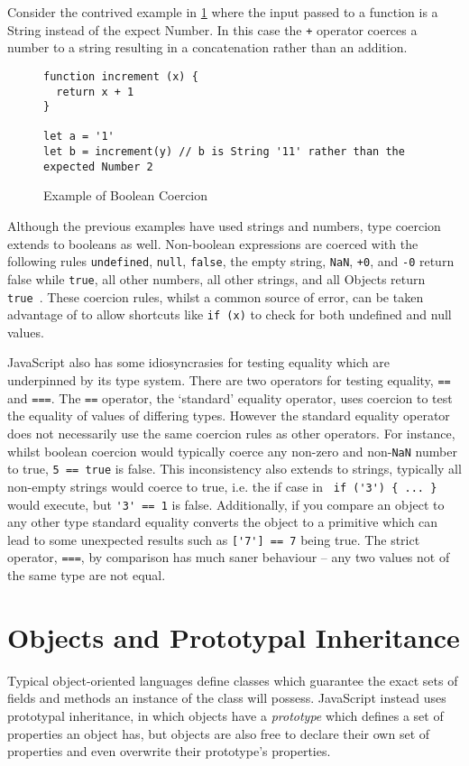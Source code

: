 \documentclass[]{final_report}
\begin{document}
Consider the contrived example in \ref{fig:js-increment-concat} where the input passed to a function is a String instead of the expect Number. In this case the \lstinline{+} operator coerces a number to a string resulting in a concatenation rather than an addition.

\begin{figure}[h]
\begin{verbatim}
function increment (x) {
  return x + 1
}

let a = '1'
let b = increment(y) // b is String '11' rather than the expected Number 2
\end{verbatim}
\caption{\label{fig:js-increment-concat} Example of Boolean Coercion}
\end{figure} 

Although the previous examples have used strings and numbers, type coercion extends to booleans as well. Non-boolean expressions are coerced with the following rules \lstinline{undefined}, \lstinline{null}, \lstinline{false}, the empty string, \lstinline{NaN}, \lstinline{+0}, and \lstinline{-0} return false while \lstinline{true}, all other numbers, all other strings, and all Objects return \lstinline{true}~\cite{EcmaScript}. These coercion rules, whilst a common source of error, can be taken advantage of to allow shortcuts like \lstinline{if (x)} to check for both undefined and null values.

JavaScript also has some idiosyncrasies for testing equality which are underpinned by its type system. There are two operators for testing equality, \lstinline{==} and \lstinline{===}. The \lstinline{==} operator, the `standard' equality operator, uses coercion to test the equality of values of differing types. However the standard equality operator does not necessarily use the same coercion rules as other operators. For instance, whilst boolean coercion would typically coerce any non-zero and non-\lstinline{NaN} number to true, \lstinline{5 == true} is false. This inconsistency also extends to strings, typically all non-empty strings would coerce to true, i.e. the if case in \lstinline| if ('3') { ... }| would execute, but \lstinline{'3' == 1} is false. Additionally, if you compare an object to any other type standard equality converts the object to a primitive which can lead to some unexpected results such as \lstinline{['7'] == 7}  being true. The strict operator, \lstinline{===}, by comparison has much saner behaviour -- any two values not of the same type are not equal.

\section{Objects and Prototypal Inheritance}
Typical object-oriented languages define classes which guarantee the exact sets of fields and methods an instance of the class will possess. JavaScript instead uses prototypal inheritance, in which objects have a \textit{prototype} which defines  a set of properties an object has, but objects are also free to declare their own set of properties and even overwrite their prototype's properties. 
\end{document}
